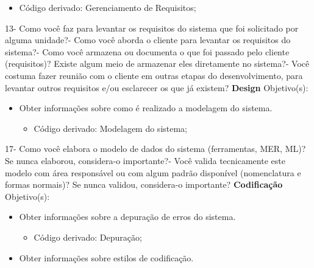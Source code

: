 \begin{apendicesenv}
\begin{itemize}
	\begin{itemize}
		\item Código derivado: Gerenciamento de Requisitos;
	\end{itemize}
\end{itemize}
13- Como você faz para levantar os requisitos do sistema que foi solicitado por alguma unidade?- Como você aborda o cliente para levantar os requisitos do sistema?- Como você armazena ou documenta o que foi passado pelo cliente (requisitos)? Existe algum meio de armazenar eles diretamente no sistema?- Você costuma fazer reunião com o cliente em outras etapas do desenvolvimento, para levantar outros requisitos e/ou esclarecer os que já existem?\newline\newline\newline\newline
\textbf{Design}\newline\newline
Objetivo(s):
\begin{itemize}
	\item Obter informações sobre como é realizado a modelagem do sistema.
	\begin{itemize}
		\item Código derivado: Modelagem do sistema;
	\end{itemize}
\end{itemize}
17- Como você elabora o modelo de dados do sistema (ferramentas, MER, ML)? Se nunca elaborou, considera-o importante?- Você valida tecnicamente este modelo com área responsável ou com algum padrão disponível (nomenclatura e formas normais)? Se nunca validou, considera-o importante?\newline
\newline
\textbf{Codificação}\newline\newline
Objetivo(s):
\begin{itemize}
	\item Obter informações sobre a depuração de erros do sistema.
	\begin{itemize}
		\item Código derivado: Depuração;
	\end{itemize}
	\item Obter informações sobre estilos de codificação.

\end{itemize}
\end{apendicesenv}
